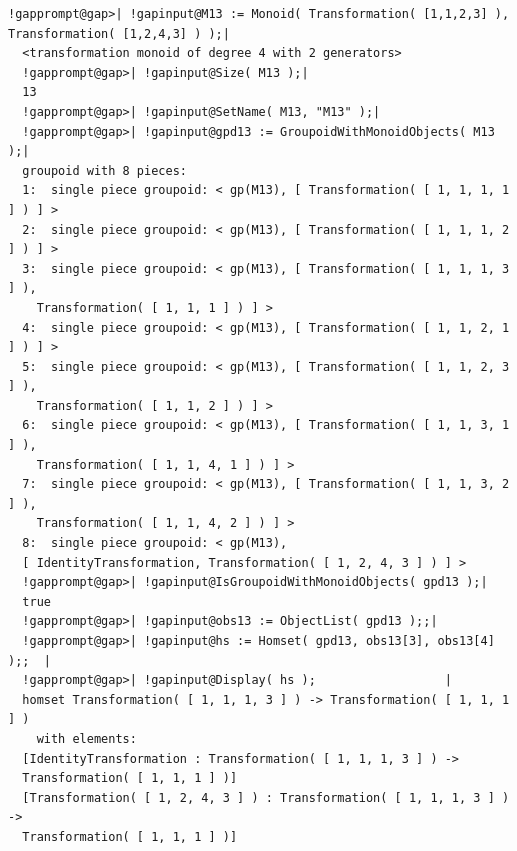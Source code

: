 \documentclass[a4paper,11pt]{report}
\begin{document}
{{\begin{Verbatim}[commandchars=!@|,fontsize=\small,frame=single,label=Example]
  !gapprompt@gap>| !gapinput@M13 := Monoid( Transformation( [1,1,2,3] ), Transformation( [1,2,4,3] ) );|
  <transformation monoid of degree 4 with 2 generators>
  !gapprompt@gap>| !gapinput@Size( M13 );|
  13
  !gapprompt@gap>| !gapinput@SetName( M13, "M13" );|
  !gapprompt@gap>| !gapinput@gpd13 := GroupoidWithMonoidObjects( M13 );|
  groupoid with 8 pieces:
  1:  single piece groupoid: < gp(M13), [ Transformation( [ 1, 1, 1, 1 ] ) ] >
  2:  single piece groupoid: < gp(M13), [ Transformation( [ 1, 1, 1, 2 ] ) ] >
  3:  single piece groupoid: < gp(M13), [ Transformation( [ 1, 1, 1, 3 ] ), 
    Transformation( [ 1, 1, 1 ] ) ] >
  4:  single piece groupoid: < gp(M13), [ Transformation( [ 1, 1, 2, 1 ] ) ] >
  5:  single piece groupoid: < gp(M13), [ Transformation( [ 1, 1, 2, 3 ] ), 
    Transformation( [ 1, 1, 2 ] ) ] >
  6:  single piece groupoid: < gp(M13), [ Transformation( [ 1, 1, 3, 1 ] ), 
    Transformation( [ 1, 1, 4, 1 ] ) ] >
  7:  single piece groupoid: < gp(M13), [ Transformation( [ 1, 1, 3, 2 ] ), 
    Transformation( [ 1, 1, 4, 2 ] ) ] >
  8:  single piece groupoid: < gp(M13), 
  [ IdentityTransformation, Transformation( [ 1, 2, 4, 3 ] ) ] >
  !gapprompt@gap>| !gapinput@IsGroupoidWithMonoidObjects( gpd13 );|
  true
  !gapprompt@gap>| !gapinput@obs13 := ObjectList( gpd13 );;|
  !gapprompt@gap>| !gapinput@hs := Homset( gpd13, obs13[3], obs13[4] );;  |
  !gapprompt@gap>| !gapinput@Display( hs );                  |
  homset Transformation( [ 1, 1, 1, 3 ] ) -> Transformation( [ 1, 1, 1 ] )
    with elements:
  [IdentityTransformation : Transformation( [ 1, 1, 1, 3 ] ) -> 
  Transformation( [ 1, 1, 1 ] )]
  [Transformation( [ 1, 2, 4, 3 ] ) : Transformation( [ 1, 1, 1, 3 ] ) -> 
  Transformation( [ 1, 1, 1 ] )]
  
\end{Verbatim}
 }

 }

  
\end{document}
